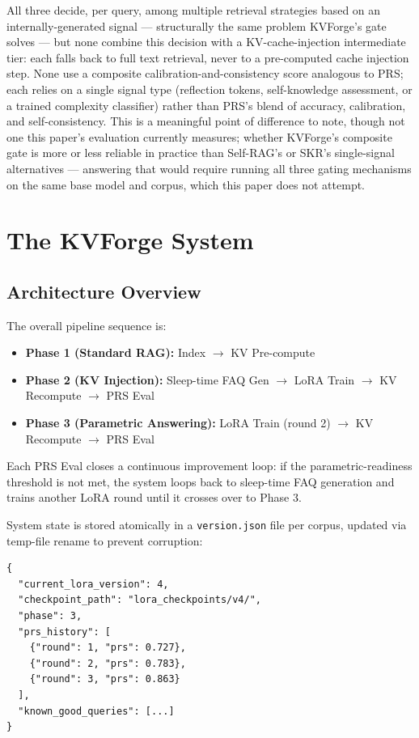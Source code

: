 \documentclass[10pt,twocolumn]{article}
\begin{document}
All three decide, per query, among multiple retrieval strategies based on an internally-generated signal --- structurally the same problem KVForge's gate solves --- but none combine this decision with a KV-cache-injection intermediate tier: each falls back to full text retrieval, never to a pre-computed cache injection step. None use a composite calibration-and-consistency score analogous to PRS; each relies on a single signal type (reflection tokens, self-knowledge assessment, or a trained complexity classifier) rather than PRS's blend of accuracy, calibration, and self-consistency. This is a meaningful point of difference to note, though not one this paper's evaluation currently measures; whether KVForge's composite gate is more or less reliable in practice than Self-RAG's or SKR's single-signal alternatives --- answering that would require running all three gating mechanisms on the same base model and corpus, which this paper does not attempt.


\section{The KVForge System}

\subsection{Architecture Overview}

The overall pipeline sequence is:


\begin{itemize}
  \item \textbf{Phase 1 (Standard RAG):} Index $\to$ KV Pre-compute
  \item \textbf{Phase 2 (KV Injection):} Sleep-time FAQ Gen $\to$ LoRA Train $\to$ KV Recompute $\to$ PRS Eval
  \item \textbf{Phase 3 (Parametric Answering):} LoRA Train (round 2) $\to$ KV Recompute $\to$ PRS Eval
\end{itemize}


Each PRS Eval closes a continuous improvement loop: if the parametric-readiness threshold is not met, the system loops back to sleep-time FAQ generation and trains another LoRA round until it crosses over to Phase 3.


System state is stored atomically in a \texttt{version.json} file per corpus, updated via temp-file rename to prevent corruption:


\begin{lstlisting}
{
  "current_lora_version": 4,
  "checkpoint_path": "lora_checkpoints/v4/",
  "phase": 3,
  "prs_history": [
    {"round": 1, "prs": 0.727},
    {"round": 2, "prs": 0.783},
    {"round": 3, "prs": 0.863}
  ],
  "known_good_queries": [...]
}
\end{lstlisting}
\end{document}
